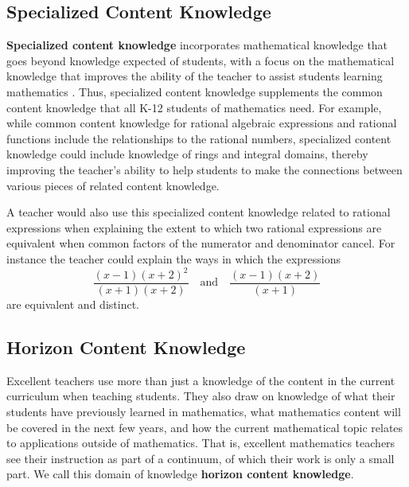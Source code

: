 \documentclass[
]{book}
\theoremstyle{definition}
\theoremstyle{definition}
\theoremstyle{definition}
\theoremstyle{definition}
\theoremstyle{remark}
\begin{document}
\hypertarget{specialized-content-knowledge}{%
\subsection{Specialized Content Knowledge}\label{specialized-content-knowledge}}

\textbf{Specialized content knowledge} incorporates mathematical knowledge that goes beyond knowledge expected of students, with a focus on the mathematical knowledge that improves the ability of the teacher to assist students learning mathematics \citep[p.~400]{Ball2008}. Thus, specialized content knowledge supplements the common content knowledge that all K-12 students of mathematics need. For example, while common content knowledge for rational algebraic expressions and rational functions include the relationships to the rational numbers, specialized content knowledge could include knowledge of rings and integral domains, thereby improving the teacher's ability to help students to make the connections between various pieces of related content knowledge.

A teacher would also use this specialized content knowledge related to rational expressions when explaining the extent to which two rational expressions are equivalent when common factors of the numerator and denominator cancel. For instance the teacher could explain the ways in which the expressions
\[ \frac{(x-1)(x+2)^2}{(x+1)(x+2)} \quad \mbox{and} \quad \frac{(x-1)(x+2)}{(x+1)}\] are equivalent and distinct.

\hypertarget{horizon-content-knowledge}{%
\subsection{Horizon Content Knowledge}\label{horizon-content-knowledge}}

Excellent teachers use more than just a knowledge of the content in the current curriculum when teaching students. They also draw on knowledge of what their students have previously learned in mathematics, what mathematics content will be covered in the next few years, and how the current mathematical topic relates to applications outside of mathematics. That is, excellent mathematics teachers see their instruction as part of a continuum, of which their work is only a small part. We call this domain of knowledge \textbf{horizon content knowledge}.
\end{document}
